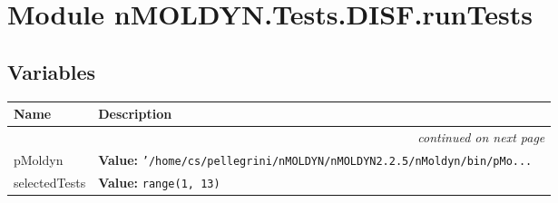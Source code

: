 %
%
%


\section{Module nMOLDYN.Tests.DISF.runTests}

    \label{nMOLDYN:Tests:DISF:runTests}


  \subsection{Variables}

    \vspace{-1cm}
\hspace{\varindent}\begin{longtable}{|p{\varnamewidth}|p{\vardescrwidth}|l}
\cline{1-2}
\cline{1-2} \centering \textbf{Name} & \centering \textbf{Description}& \\
\cline{1-2}
\endhead\cline{1-2}\multicolumn{3}{r}{\small\textit{continued on next page}}\\\endfoot\cline{1-2}
\endlastfoot\raggedright p\-M\-o\-l\-d\-y\-n\- & \raggedright \textbf{Value:} 
{\tt '/home/cs/pellegrini/nMOLDYN/nMOLDYN2.2.5/nMoldyn/bin/pMo\texttt{...}}&\\
\cline{1-2}
\raggedright s\-e\-l\-e\-c\-t\-e\-d\-T\-e\-s\-t\-s\- & \raggedright \textbf{Value:} 
{\tt range(1, 13)}&\\
\cline{1-2}
\end{longtable}

